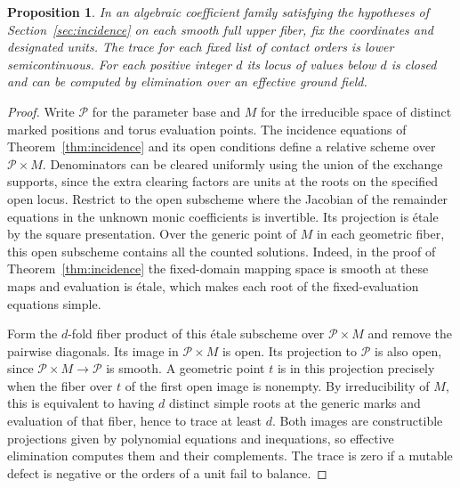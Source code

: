 \documentclass[11pt,reqno]{amsart}
\numberwithin{equation}{section}
\newtheorem{proposition}[theorem]{Proposition}
\theoremstyle{definition}
\theoremstyle{remark}
\begin{document}
\begin{proposition}\label{prop:trace-drop-locus}
In an algebraic coefficient family satisfying the hypotheses of
Section~\ref{sec:incidence} on each smooth full upper fiber, fix the
coordinates and designated units. The trace for each fixed
list of contact orders is lower semicontinuous. For each positive integer
\(d\) its locus of values below \(d\) is closed and can be computed
by elimination over an effective ground field.
\end{proposition}
\begin{proof}
Write \(\mathcal P\) for the parameter base and \(M\) for the irreducible
space of distinct marked positions and torus evaluation points.
The incidence equations of Theorem~\ref{thm:incidence} and its
open conditions define a relative scheme over \(\mathcal P\times M\).
Denominators can be cleared uniformly using the union of the
exchange supports, since the extra clearing factors are units
at the roots on the specified open locus. Restrict to the open
subscheme where the Jacobian of the remainder equations in the
unknown monic coefficients is invertible. Its projection is
\'etale by the square presentation. Over the generic point of
\(M\) in each geometric fiber, this open subscheme contains all
the counted solutions. Indeed, in the proof of
Theorem~\ref{thm:incidence} the fixed-domain mapping space is
smooth at these maps and evaluation is \'etale, which makes each
root of the fixed-evaluation equations simple.

Form the \(d\)-fold fiber product of this \'etale subscheme over
\(\mathcal P\times M\) and remove the pairwise diagonals. Its image in
\(\mathcal P\times M\) is open. Its projection to \(\mathcal P\) is also open,
since \(\mathcal P\times M\to \mathcal P\) is smooth. A geometric point \(t\) is
in this projection precisely when the fiber over \(t\) of the
first open image is nonempty. By irreducibility of \(M\), this
is equivalent to having \(d\) distinct simple roots at the generic
marks and evaluation of that fiber, hence to trace at least \(d\).
Both images are constructible projections given by polynomial
equations and inequations, so effective elimination computes them
and their complements. The trace is zero if a mutable defect is negative or the orders of a
unit fail to balance.
\end{proof}
\end{document}
